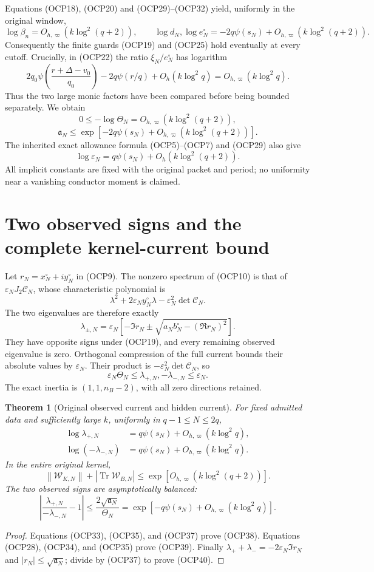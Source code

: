 \documentclass[11pt]{article}
\newtheorem{theorem}{Theorem}[section]
\newcommand{\tr}{\operatorname{Tr}}
\newcommand{\eps}{\varepsilon}
\newcommand{\norm}[1]{\left\lVert#1\right\rVert}
\begin{document}
Equations (OCP18), (OCP20) and (OCP29)--(OCP32) yield, uniformly in the original window,
\[
 \log\beta_n=O_{h,\varpi}(k\log^2(q+2)),\qquad
 \log d_N,\log e_N^{\circ}
 =-2q\psi(s_N)+O_{h,\varpi}(k\log^2(q+2)).
\]
Consequently the finite guards (OCP19) and (OCP25) hold eventually at every cutoff. Crucially, in (OCP22) the ratio $\xi_N/e_N^{\circ}$ has logarithm
\[
 2q_0\psi\left(\frac{r+\Delta-v_0}{q_0}\right)
 -2q\psi(r/q)+O_h(k\log^2q)
 =O_{h,\varpi}(k\log^2q).
\]
Thus the two large monic factors have been compared before being bounded separately. We obtain
\[
 \boxed{0\le-\log\Theta_N=O_{h,\varpi}(k\log^2(q+2)),}
 \tag{OCP33}
\]
\[
 \boxed{\mathfrak a_N\le
 \exp[-2q\psi(s_N)+O_{h,\varpi}(k\log^2(q+2))].}
 \tag{OCP34}
\]
The inherited exact allowance formula (OCP5)--(OCP7) and (OCP29) also give
\[
 \log\eps_N=q\psi(s_N)+O_h(k\log^2(q+2)).
 \tag{OCP35}
\]
All implicit constants are fixed with the original packet and period; no uniformity near a vanishing conductor moment is claimed.

\section{Two observed signs and the complete kernel-current bound}
Let $r_N=x_N^{\circ}+iy_N^{\circ}$ in (OCP9). The nonzero spectrum of (OCP10) is that of $\eps_NJ_2\mathcal C_N$, whose characteristic polynomial is
\[
 \lambda^2+2\eps_Ny_N^{\circ}\lambda
 -\eps_N^2\det\mathcal C_N.
\]
The two eigenvalues are therefore exactly
\[
 \boxed{\lambda_{\pm,N}=\eps_N\left[
 -\Im r_N\pm\sqrt{a_Nb_N^{\circ}-(\Re r_N)^2}\right].}
 \tag{OCP36}
\]
They have opposite signs under (OCP19), and every remaining observed eigenvalue is zero. Orthogonal compression of the full current bounds their absolute values by $\eps_N$. Their product is $-\eps_N^2\det\mathcal C_N$, so
\[
 \boxed{\eps_N\Theta_N\le\lambda_{+,N},-\lambda_{-,N}\le\eps_N.}
 \tag{OCP37}
\]
The exact inertia is $(1,1,n_B-2)$, with all zero directions retained.

\begin{theorem}[Original observed current and hidden current]
For fixed admitted data and sufficiently large $k$, uniformly in $q-1\le N\le2q$,
\[
 \boxed{\begin{aligned}
 \log\lambda_{+,N}&=q\psi(s_N)+O_{h,\varpi}(k\log^2q),\\
 \log(-\lambda_{-,N})&=q\psi(s_N)+O_{h,\varpi}(k\log^2q).
 \end{aligned}}
 \tag{OCP38}
\]
In the entire original kernel,
\[
 \boxed{\norm{\mathscr W_{K,N}}+|\tr\mathscr W_{B,N}|
 \le\exp[O_{h,\varpi}(k\log^2(q+2))].}
 \tag{OCP39}
\]
The two observed signs are asymptotically balanced:
\[
 \left|\frac{\lambda_{+,N}}{-\lambda_{-,N}}-1\right|
 \le\frac{2\sqrt{\mathfrak a_N}}{\Theta_N}
 =\exp[-q\psi(s_N)+O_{h,\varpi}(k\log^2q)].
 \tag{OCP40}
\]
\end{theorem}
\begin{proof}
Equations (OCP33), (OCP35), and (OCP37) prove (OCP38). Equations (OCP28), (OCP34), and (OCP35) prove (OCP39). Finally $\lambda_++\lambda_-=-2\eps_N\Im r_N$ and $|r_N|\le\sqrt{\mathfrak a_N}$; divide by (OCP37) to prove (OCP40).
\end{proof}
\end{document}
